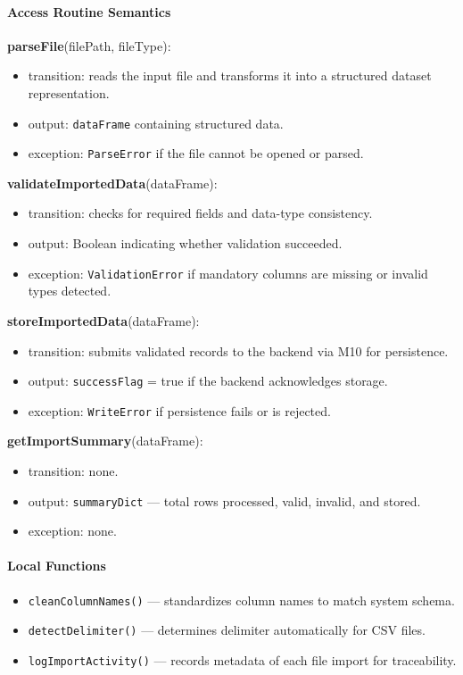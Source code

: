 \documentclass[12pt, titlepage]{article}
\begin{document}
\paragraph{Access Routine Semantics}

\noindent \textbf{parseFile}(filePath, fileType):
\begin{itemize}
  \item transition: reads the input file and transforms it into a structured dataset representation.
  \item output: \texttt{dataFrame} containing structured data.
  \item exception: \texttt{ParseError} if the file cannot be opened or parsed.
\end{itemize}

\noindent \textbf{validateImportedData}(dataFrame):
\begin{itemize}
  \item transition: checks for required fields and data-type consistency.
  \item output: Boolean indicating whether validation succeeded.
  \item exception: \texttt{ValidationError} if mandatory columns are missing or invalid types detected.
\end{itemize}

\noindent \textbf{storeImportedData}(dataFrame):
\begin{itemize}
  \item transition: submits validated records to the backend via M10 for persistence.
  \item output: \texttt{successFlag} = true if the backend acknowledges storage.
  \item exception: \texttt{WriteError} if persistence fails or is rejected.
\end{itemize}


\noindent \textbf{getImportSummary}(dataFrame):
\begin{itemize}
  \item transition: none.
  \item output: \texttt{summaryDict} — total rows processed, valid, invalid, and stored.
  \item exception: none.
\end{itemize}

\paragraph{Local Functions}
\begin{itemize}
  \item \texttt{cleanColumnNames()} — standardizes column names to match system schema.
  \item \texttt{detectDelimiter()} — determines delimiter automatically for CSV files.
  \item \texttt{logImportActivity()} — records metadata of each file import for traceability.
\end{itemize}
\end{document}
